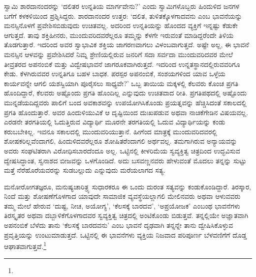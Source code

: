 ಸ್ವಾಮಿ ಶಾರದಾನಂದರನ್ನು ‘ದಲಿತರ ಉನ್ನತಿಯ ಮಾರ್ಗವೇನು?’ ಎಂದು ಸ್ವಾಮಿ\-ಗಳೊ\-ಬ್ಬರು ಹಿಂದುಳಿದ ಜನಗಳ ಬಗೆಗೆ ಕಳಕಳಿಯಿಂದ ಪ್ರಶ್ನಿಸಿದ್ದರು. ಶಾರದಾನಂದರ ಉತ್ತರ: ‘ದಲಿತ, ತುಳಿತಕ್ಕೊಳಗಾದವನು ಎಂಬ ಭಾವನೆಯನ್ನು ಮನಸ್ಸಿನೊಳಗೆ ಪ್ರವೇಶಿಸಬಿಡುವುದು ಉಚಿತವಲ್ಲ. ಅದರಿಂದ ಉನ್ನತಿಯನ್ನು ಹೊಂದದ ವ್ಯಕ್ತಿಗೆ ಇನ್ನಷ್ಟು ಕೆಡುಕೇ ಆಗುತ್ತದೆ. ತಾವು ಶಕ್ತಿಹೀನರು, ಮುಂದುವರಿದವರೆಲ್ಲರೂ ತಮ್ಮನ್ನು ಕೆಳಗೇ ಇರುವಂತೆ ಮಾಡಿದ್ದರೆಂದೇ ತಿಳಿಯ ತೊಡಗುತ್ತಾರೆ. ಇದರಿಂದ ಅವರ ಸ್ವಾಭಾವಿಕ ಶಕ್ತಿಯ ಜಾಗರಣವಾಗಲು ವಿಳಂಬವಾಗುತ್ತದೆ. ಅಷ್ಟೇ ಅಲ್ಲ, ಈ ಭಾವನೆ ಮನಸ್ಸಿನ ಆಳವನ್ನು ಪ್ರವೇಶಿಸಿದರೆ ನಿಮ್ನ ಶ್ರೇಣಿಯಲ್ಲಿರುವ ಜನರಿಗೆ ಸದಾ ಸರ್ವದಾ ಮುಂದುವರಿದವರ ಮೇಲೆ ತೀವ್ರತರದ ಅಪನಂಬಿಕೆ ಮತ್ತು ವಿದ್ವೇಷಭಾವನೆ ಜಾಗರೂಕವಾಗಿರುತ್ತದೆ. ಇದರಿಂದ ಉನ್ನತಸ್ಥಾನದಲ್ಲಿರುವವರಿಗೂ ಕೇಡು. ಕೆಳಗಿರುವವರ ಉನ್ನತಿಗೂ ಬಹಳ ಬಾಧಕ. ಪರಸ್ಪರ ಅಪನಂಬಿಕೆ, ಸಂಶಯಗಳಿಂದ ಯಾವ ಒಳ್ಳೆಯ ಕಾರ್ಯವನ್ನೇ ಆಗಲಿ ಯಶಸ್ವಿಯಾಗಿ ಪೂರೈಸಲು ಸಾಧ್ಯವೇ?’ ಒಬ್ಬ ತಾಯಿಯ ಮಕ್ಕಳಲ್ಲಿ ಕೆಲವರು ಕೊಂಚ ಪ್ರಗತಿ ಹೊಂದಿದ್ದಾರೆ, ಕೆಲವರು ಅಷ್ಟೊಂದು ಪ್ರಗತಿ ಹೊಂದಿಲ್ಲ ಎನ್ನುವುದು ಉಚಿತವಾದ ರೀತಿ. ಪ್ರಗತಿಪಥದಲ್ಲಿ ಅಷ್ಟೊಂದು ಮುನ್ನಡೆಯದಿದ್ದವರು ಪಾಲಿಗೆ ಬಂದ ಅವಕಾಶವನ್ನು ಉಪಯೋಗಿಸಿಕೊಂಡು ಪ್ರಯತ್ನವನ್ನು ಹೆಚ್ಚಿಸಿದಂತೆ ಸಕಾಲದಲ್ಲಿ ಪ್ರಗತಿ ಹೊಂದುತ್ತಾರೆ. ಅವರ ಹಿಂದುಳಿಯುವಿಕೆ ಆ ದೃಷ್ಟಿಯಿಂದ ದುಃಖಪಡುವ ಅಥವಾ ನಾಚಿಕೆಗೇಡಿನ ವಿಷಯವಲ್ಲ. ಎರಡನೇ ತರಗತಿಯಲ್ಲಿ ಓದುತ್ತಿರುವ ವಿದ್ಯಾರ್ಥಿ ಮೂರನೇ ತರಗತಿಯಲ್ಲಿ ಓದುವ ವಿದ್ಯಾರ್ಥಿಯನ್ನು ಕಂಡು ಕರುಬಬೇಕಿಲ್ಲ. ಇವನೂ ಸಕಾಲದಲ್ಲಿ ಮುಂದುವರಿಯುತ್ತಾನೆ. ಹೀಗೆಂದ ಮಾತ್ರಕ್ಕೆ ಮುಂದು\-ವರಿದವರಲ್ಲಿ ಶೋಷಕರಿಲ್ಲವೆಂದಾಗಲಿ, ಹಿಂದುಳಿದವರೆಲ್ಲರೂ ಶೋಷಿತರೆಂದಾಗಲಿ ಅರ್ಥವಲ್ಲ. ತಮಗಾಗಿರುವ ಅನ್ಯಾಯವನ್ನು ಅವರು ಸಂಘಟಿತರಾಗಿ ವಿರೋಧಿಸಬಾರದೆಂದೂ ಅಲ್ಲ. ಒಟ್ಟಿನಲ್ಲಿ ಕೀಳರಿಮೆಯ ಸ್ವವ್ಯಕ್ತಿತ್ವ ಚಿತ್ರದಿಂದ ಉದ್ಭವಿಸುವ ದ್ವೇಷಸಿದ್ಧಾಂತ, ಸ್ವನಾಶದ ಬೀಜವನ್ನು ಒಳಗೊಂಡಿದೆ. ಅದು ಬಸವಣ್ಣನವರು ಹೇಳುವಂತೆ ಮೊದಲು ತನ್ನನ್ನು ಸುಟ್ಟು ಮತ್ತೆ ನೆರೆಹೊರೆ\-ಯವರನ್ನು ಸುಡಬಲ್ಲುದು ಎನ್ನುವುದು ಮರೆಯಲಾಗದ ಸತ್ಯ.

ಮನೋರೋಗತಜ್ಞರೂ, ಮನುಷ್ಯಚಾರಿತ್ರ್ಯ ಸುಧಾರಕರೂ ಈ ಒಂದು ದುರಂತ ಸತ್ಯವನ್ನು ಕಂಡುಕೊಂಡಿದ್ದಾರೆ. ತಿರಸ್ಕಾರ, ನಿಂದೆ ಮತ್ತು ಶೋಷಣೆಗೊಳಗಾದ ಯಾವುದೇ ಸಾಮಾಜಿಕ ವ್ಯವಸ್ಥೆಯಲ್ಲಾಗಲಿ ಮೇಲಿನವರು ಅಥವಾ ಆಳುವವರು ತಮ್ಮ ಮೇಲೆ ಹೇರುವ ‘ದುಷ್ಟ, ನೀಚ, ಅಯೋಗ್ಯ’, ‘ಕೆಲಸಕ್ಕೆ ಬಾರದವ’, ‘ಅಪ್ರಯೋಜಕ’ ಎಂಬಂಥ ಭಾವನೆಗಳು ತಿರಸ್ಕೃತರ ಅಥವಾ ದಬ್ಬಾಳಿಕೆಗೊಳಗಾದವರ ಸ್ವವ್ಯಕ್ತಿತ್ವ ಚಿತ್ರದಲ್ಲಿ ಅಂಟಿಕೊಂಡು ಬಿಡುತ್ತವೆ. ತನ್ನಲ್ಲಿಯೇ ಅಜ್ಞಾತವಾಗಿ ಅಪನಂಬಿಕೆ ಬೆಳೆದು ತಾನು ‘ಕೆಲಸಕ್ಕೆ ಬಾರದವನು’ ಎಂಬ ಭಾವನೆ ದೃಢವಾಗಿ ತನ್ನನ್ನೇ ತಾನು ದ್ವೇಷಿಸಿಕೊಳ್ಳುವ ಪ್ರವೃತ್ತಿಯನ್ನು ಉಂಟುಮಾಡುತ್ತದೆ. ಒಟ್ಟಿನಲ್ಲಿ ಈ ಭಾವನೆಗಳು ವ್ಯಕ್ತಿಯ ನಿಜವಾದ ಪರಿಪೂರ್ಣ ಬೆಳವಣಿಗೆಗೆ ದೊಡ್ಡ ಆಘಾತವಾಗುತ್ತವೆ.\footnote{

}

\newpage

